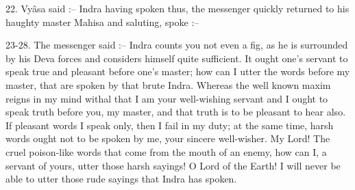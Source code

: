 22. Vy\^asa said :-- Indra having spoken thus, the messenger quickly returned to his haughty master Mahisa and saluting, spoke :--

23-28. The messenger said :-- Indra counts you not even a fig, as he is surrounded by his Deva forces and considers himself quite sufficient. It ought one's servant to speak true and pleasant before one's master; how can I utter the words before my master, that are spoken by that brute Indra. Whereas the well known maxim reigns in my mind withal that I am your well-wishing servant and I ought to speak truth before you, my master, and that truth is to be pleasant to hear also. If pleasant words I speak only, then I fail in my duty; at the same time, harsh words ought not to be spoken by me, your sincere well-wisher. My Lord! The cruel poison-like words that come from the mouth of an enemy, how can I, a servant of yours, utter those harsh sayings! O Lord of the Earth! I will never be able to utter those rude sayings that Indra has spoken.

